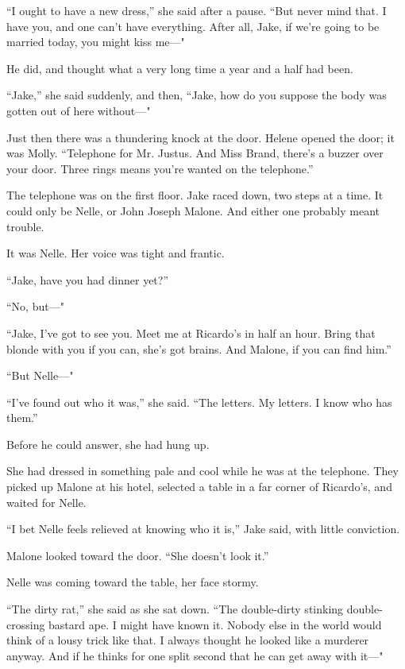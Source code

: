 \documentclass{novel}
\begin{document}
“I ought to have a new dress,” she said after a pause. “But never mind that. I have you, and one can’t have everything. After all, Jake, if we’re going to be married today, you might kiss me—"

He did, and thought what a very long time a year and a half had been.

“Jake,” she said suddenly, and then, “Jake, how do you suppose the body was gotten out of here without—"

Just then there was a thundering knock at the door. Helene opened the door; it was Molly. “Telephone for Mr. Justus. And Miss Brand, there’s a buzzer over your door. Three rings means you’re wanted on the telephone.”

The telephone was on the first floor. Jake raced down, two steps at a time. It could only be Nelle, or John Joseph Malone. And either one probably meant trouble.

It was Nelle. Her voice was tight and frantic.

“Jake, have you had dinner yet?”

“No, but—"

“Jake, I've got to see you. Meet me at Ricardo’s in half an hour. Bring that blonde with you if you can, she’s got brains. And Malone, if you can find him.”

“But Nelle—"

“I've found out who it was,” she said. “The letters. My letters. I know who has them.”

Before he could answer, she had hung up.

\begin{ChapterStart}
\vspace{3\nbs}
\end{ChapterStart}

She had dressed in something pale and cool while he was at the telephone. They picked up Malone at his hotel, selected a table in a far corner of Ricardo’s, and waited for Nelle.

“I bet Nelle feels relieved at knowing who it is,” Jake said, with little conviction.

Malone looked toward the door. “She doesn’t look it.”

Nelle was coming toward the table, her face stormy.

“The dirty rat,” she said as she sat down. “The double-dirty stinking double-crossing bastard ape. I might have known it. Nobody else in the world would think of a lousy trick like that. I always thought he looked like a murderer anyway. And if he thinks for one split second that he can get away with it—"
\end{document}
